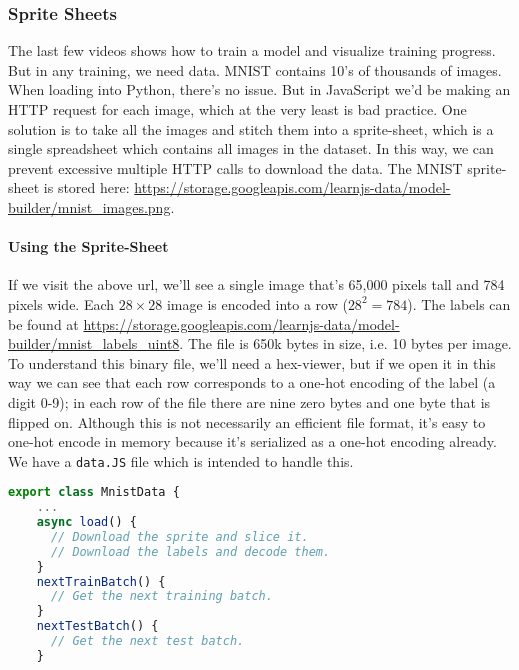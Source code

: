 \documentclass[12pt]{article}
\begin{document}
\subsubsection{Sprite Sheets}
The last few videos shows how to train a model and visualize training progress. But in any training, we need data. MNIST contains 10's of thousands of images. When loading into Python, there's no issue. But in JavaScript we'd be making an HTTP request for each image, which at the very least is bad practice. One solution is to take all the images and stitch them into a sprite-sheet, which is a single spreadsheet which contains all images in the dataset. In this way, we can prevent excessive multiple HTTP calls to download the data.
The MNIST sprite-sheet is stored here: \url{https://storage.googleapis.com/learnjs-data/model-builder/mnist_images.png}.
\paragraph{Using the Sprite-Sheet} If we visit the above url, we'll see a single image that's 65,000 pixels tall and 784 pixels wide. Each $28 \times 28$ image is encoded into a row ($28^2 = 784$). The labels can be found at
\url{https://storage.googleapis.com/learnjs-data/model-builder/mnist_labels_uint8}. The file is 650k bytes in size, i.e. 10 bytes per image. To understand this binary file, we'll need a hex-viewer, but if we open it in this way we can see that each row corresponds to a one-hot encoding of the label (a digit 0-9); in each row of the file there are nine zero bytes and one byte that is flipped on. Although this is not necessarily an efficient file format, it's easy to one-hot encode in memory because it's serialized as a one-hot encoding already. We have a \texttt{data.JS} file which is intended to handle this.

\begin{lstlisting}[language=JavaScript]
  export class MnistData {
    ...
    async load() {
      // Download the sprite and slice it.
      // Download the labels and decode them.
    }
    nextTrainBatch() {
      // Get the next training batch.
    }
    nextTestBatch() {
      // Get the next test batch.
    }
\end{lstlisting}
\end{document}
